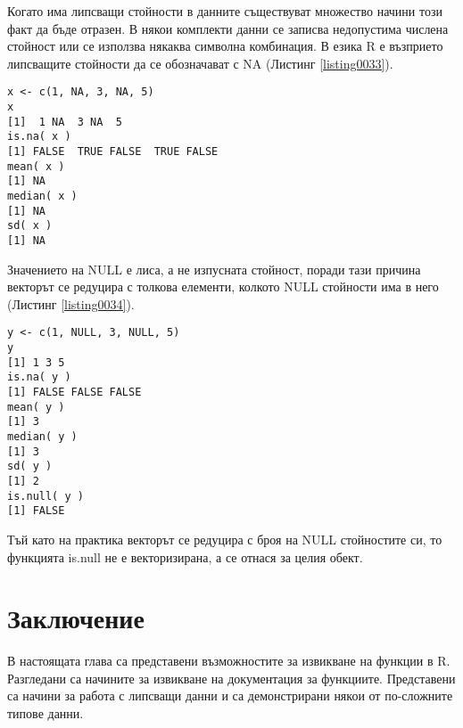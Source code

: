 Когато има липсващи стойности в данните съществуват множество начини този факт да бъде отразен. В някои комплекти данни се записва недопустима числена стойност или се използва някаква символна комбинация. В езика R е възприето липсващите стойности да се обозначават с NA (Листинг \ref{listing0033}).

\begin{lstlisting}[caption=Липсващи стойности, label=listing0033]
x <- c(1, NA, 3, NA, 5)
x
[1]  1 NA  3 NA  5
is.na( x )
[1] FALSE  TRUE FALSE  TRUE FALSE
mean( x )
[1] NA
median( x )
[1] NA
sd( x )
[1] NA
\end{lstlisting}

Значението на NULL е лиса, а не изпусната стойност, поради тази причина векторът се редуцира с толкова елементи, колкото NULL стойности има в него (Листинг \ref{listing0034}).

\begin{lstlisting}[caption=Липсващи стойности, label=listing0034]
y <- c(1, NULL, 3, NULL, 5)
y
[1] 1 3 5
is.na( y )
[1] FALSE FALSE FALSE
mean( y )
[1] 3
median( y )
[1] 3
sd( y )
[1] 2
is.null( y )
[1] FALSE
\end{lstlisting}

Тъй като на практика векторът се редуцира с броя на NULL стойностите си, то функцията is.null не е векторизирана, а се отнася за целия обект. 

\section*{Заключение}

В настоящата глава са представени възможностите за извикване на функции в R. Разгледани са начините за извикване на документация за функциите. Представени са начини за работа с липсващи данни и са демонстрирани някои от по-сложните типове данни. 

